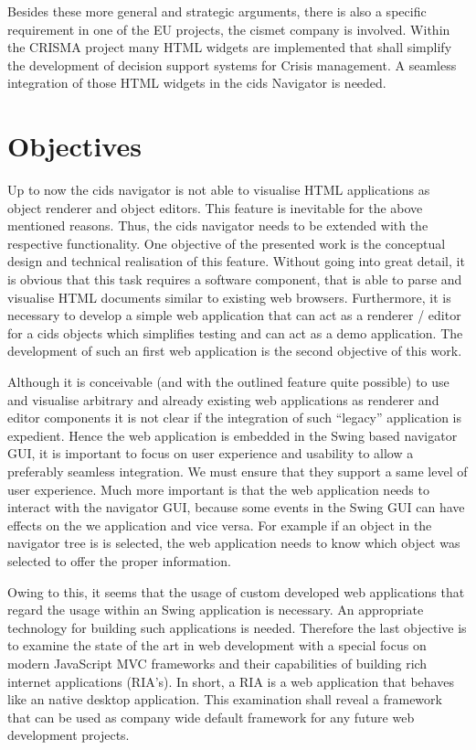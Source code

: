  
Besides these more general and strategic arguments, there is also a specific requirement in one of the EU projects, the cismet company is involved.
Within the CRISMA project many HTML widgets are implemented that shall simplify the development of decision support systems for Crisis management.
A seamless integration of those HTML widgets in the cids Navigator is needed.


\section{Objectives}\label{chap:intro-objectives}

Up to now the cids navigator is not able to visualise HTML applications as object renderer and object editors.
This feature is inevitable for the above mentioned reasons.
Thus, the cids navigator needs to be extended with the respective functionality.
One objective of the presented work is the conceptual design and technical realisation of this feature.
Without going into great detail, it is obvious that this task requires a software component, that is able to parse and visualise HTML documents similar to existing web browsers.
Furthermore, it is necessary to develop a simple web application that can act as a renderer / editor for a cids objects  which simplifies testing and can act as a demo application.
The development of such an first web application is the second objective of this work.

Although it is conceivable (and with the outlined feature quite possible) to use and visualise arbitrary and already existing web applications as renderer and editor components it is not clear if the integration of such \enquote{legacy} application is expedient.
Hence the web application is embedded in the Swing based navigator GUI, it is important to focus on user experience and usability to allow a preferably seamless integration.
We must ensure that they support a same level of user experience.
Much more important is that the web application needs to interact with the navigator GUI, because some events in the Swing GUI can have effects on the we application and vice versa. 
For example if an object in the navigator tree is is selected, the web application needs to know which object was selected to offer the proper information.


Owing to this, it seems that the usage of custom developed web applications that regard the usage within an Swing application is necessary.
An appropriate technology for building such applications is needed.
Therefore the last objective is to examine the state of the art in web development with a special focus on modern JavaScript MVC frameworks and their capabilities of building rich internet applications (RIA's). 
In short, a RIA is a web application that behaves like an native desktop application.
This examination shall reveal a framework that can be used as company wide default framework for any future web development projects.

